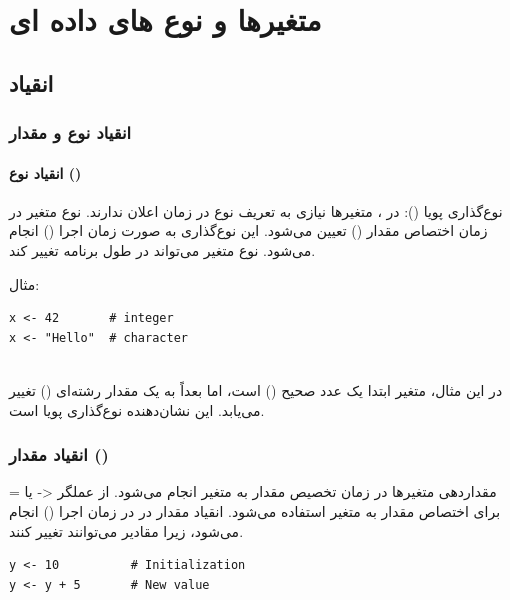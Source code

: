 \documentclass[11pt, a4paper, oneside]{book}
\begin{document}
	\chapter{متغیرها و نوع های داده ای}
	
		\section{انقیاد}
		
			\subsection{انقیاد نوع و مقدار}
			
				\subsubsection{انقیاد نوع ()}
				
					نوع‌گذاری پویا (): در ، متغیرها نیازی به تعریف نوع در زمان اعلان ندارند. نوع متغیر در زمان اختصاص مقدار () تعیین می‌شود.
					این نوع‌گذاری به صورت زمان اجرا () انجام می‌شود.
					نوع متغیر می‌تواند در طول برنامه تغییر کند.
					
					
					مثال:
					\begin{latin}
						\begin{lstlisting}[caption={\lr{Type Binding}}] 
x <- 42       # integer
x <- "Hello"  # character
							
						\end{lstlisting}
					\end{latin}
					
					در این مثال، متغیر  ابتدا یک عدد صحیح () است، اما بعداً به یک مقدار رشته‌ای () تغییر می‌یابد. این نشان‌دهنده نوع‌گذاری پویا است.
					
				\subsection{انقیاد مقدار ()}
				
					مقداردهی متغیرها در زمان تخصیص مقدار به متغیر انجام می‌شود. از عملگر <- یا = برای اختصاص مقدار به متغیر استفاده می‌شود.
					انقیاد مقدار در  در زمان اجرا () انجام می‌شود، زیرا مقادیر می‌توانند تغییر کنند.
					
					\begin{latin}
						\begin{lstlisting}[caption={\lr{Value Binding}}] 
y <- 10          # Initialization
y <- y + 5       # New value

						\end{lstlisting}
					\end{latin}
					
\end{document}
